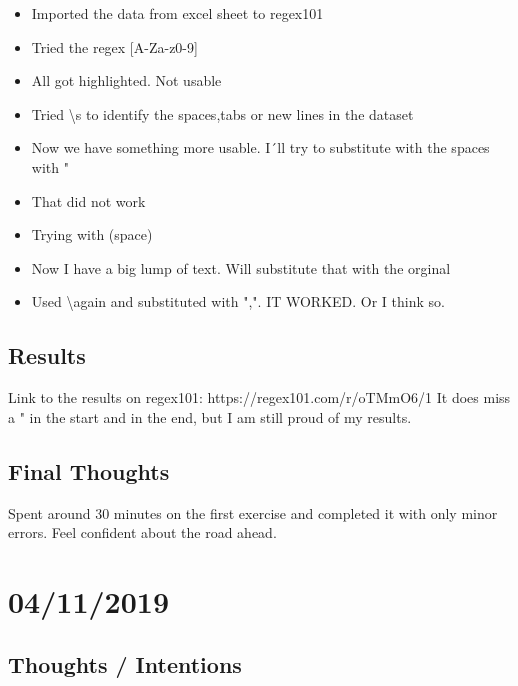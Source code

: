 \documentclass{article}
\begin{document}
\begin{itemize}
\item  Imported the data from excel sheet to  regex101 

\item Tried the regex [A-Za-z0-9]

\item All got highlighted. Not usable 

\item Tried \textbackslash s to identify the spaces,tabs or new lines in the dataset 

\item Now we have something more usable. I´ll try to substitute with the spaces with " 

\item That did not work 

\item Trying with (space) 

\item Now I have a big lump of text. Will substitute that with the orginal

\item Used \textbackslash again and substituted with ",". IT WORKED. Or I think so. 





\end{itemize}\subsection{Results}

\text Link to the results on regex101: https://regex101.com/r/oTMmO6/1  
It does miss a " in the start and in the end, but I am still proud of my results. 



\subsection{Final Thoughts}

\text Spent around 30 minutes on the first exercise and completed it with only minor errors. Feel confident about the road ahead.  


\section{04/11/2019}
\subsection{Thoughts / Intentions}
\end{document}
